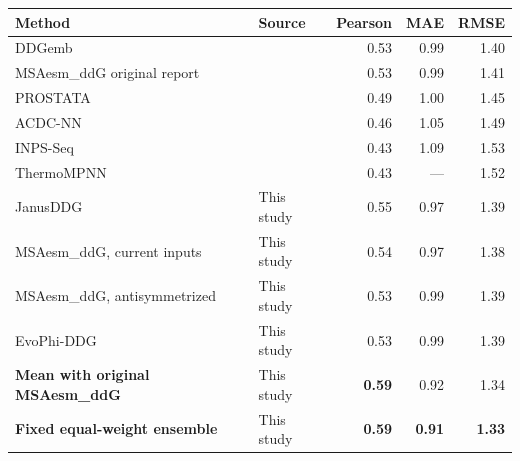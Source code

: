 \begin{tabular}{llrrr}\toprule
Method & Source & Pearson & MAE & RMSE\\\midrule
DDGemb & \citep{savojardo2025} & 0.53 & 0.99 & 1.40 \\
MSAesm\_ddG original report & \citep{cuturello2024} & 0.53 & 0.99 & 1.41 \\
PROSTATA & \citep{umerenkov2023,savojardo2025} & 0.49 & 1.00 & 1.45 \\
ACDC-NN & \citep{pancotti2022,savojardo2025} & 0.46 & 1.05 & 1.49 \\
INPS-Seq & \citep{pancotti2022,savojardo2025} & 0.43 & 1.09 & 1.53 \\
ThermoMPNN & \citep{cuturello2024,dieckhaus2024} & 0.43 & --- & 1.52 \\
\midrule
JanusDDG & This study & 0.55 & 0.97 & 1.39 \\
MSAesm\_ddG, current inputs & This study & 0.54 & 0.97 & 1.38 \\
MSAesm\_ddG, antisymmetrized & This study & 0.53 & 0.99 & 1.39 \\
EvoPhi-DDG & This study & 0.53 & 0.99 & 1.39 \\
\textbf{Mean with original MSAesm\_ddG} & This study & \textbf{0.59} & 0.92 & 1.34 \\
\textbf{Fixed equal-weight ensemble} & This study & \textbf{0.59} & \textbf{0.91} & \textbf{1.33} \\
\bottomrule\end{tabular}
